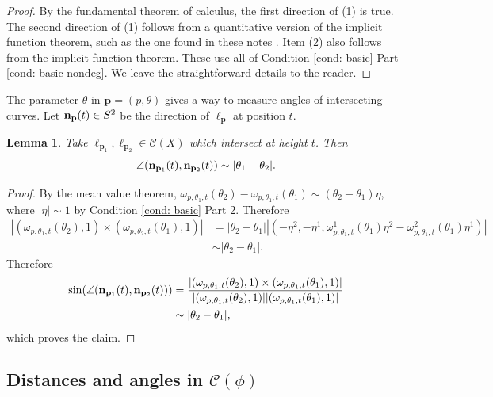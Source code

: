 \documentclass[12pt]{amsart}
\numberwithin{equation}{section}
\newtheorem{lemma}{Lemma}[section]
\newcommand{\bn}{\mathbf{n}}
\newcommand{\cC}{\mathcal C}
\renewcommand{\bn}{{\bf n}}
\renewcommand{\cC}{{\mathcal C}}
\newcommand{\1}{\mathbbm{1}}
\newcommand{\p}{\mathbf p}
\begin{document}
\begin{proof}
    By the fundamental theorem of calculus, the first direction of (1) is true. The second direction of (1) follows from a quantitative version of the implicit function theorem, such as the one found in these notes \cite{LiveraniImplicit}. 
    Item (2) also follows from the implicit function theorem. These use all of Condition \ref{cond: basic} Part \ref{cond: basic nondeg}. We leave the straightforward details to the reader. 
\end{proof}

The parameter $\theta$ in $\p = (p,\theta)$ gives a way to measure angles of intersecting curves. Let $\bn_{\p}(t) \in S^2$ be the direction of $\ell_\p$ at position $t$. 
\begin{lemma}\label{lem: angles in C(X)}
    Take $\ell_{\p_1}, \ell_{\p_2} \in \cC(X)$ which intersect at height $t$. Then 
    \begin{align}
        \angle(\bn_{\p_1}(t), \bn_{\p_2}(t)) \sim |\theta_1 - \theta_2|.
    \end{align}
\end{lemma}

\begin{proof}
    By the mean value theorem, $\omega_{p,\theta_1,t}(\theta_2) - \omega_{p,\theta_1,t}(\theta_1) \sim (\theta_2 - \theta_1) \eta$, where $|\eta| \sim 1$ by Condition \ref{cond: basic} Part 2. Therefore 
    \begin{align}
        |(\omega_{p,\theta_1,t}(\theta_2), 1) \times (\omega_{p,\theta_2,t}(\theta_1),1)| &= |\theta_2 - \theta_1| |(-\eta^2,-\eta^1, \omega_{p,\theta_1,t}^1(\theta_1)\eta^2 - \omega^2_{p,\theta_1,t}(\theta_1)\eta^1)| \\ &\sim |\theta_2 - \theta_1|. 
    \end{align}
    Therefore 
    \begin{align}
        \sin (\angle(\bn_{\p_1}(t), \bn_{\p_2}(t))) &= \frac{|(\omega_{p,\theta_1,t}(\theta_2), 1) \times (\omega_{p,\theta_1,t}(\theta_1), 1)|}{|(\omega_{p,\theta_1,t}(\theta_2), 1)||(\omega_{p,\theta_1,t}(\theta_1), 1)|} \\&\sim |\theta_2 - \theta_1|,
    \end{align}
    which proves the claim. 
\end{proof}

\subsection{Distances and angles in $\cC(\phi)$}
\end{document}
